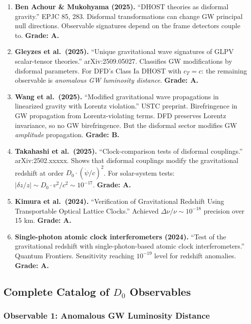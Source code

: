 \documentclass[11pt,a4paper]{article}
\begin{document}
\begin{enumerate}
\item \textbf{Ben Achour \& Mukohyama (2025).} ``DHOST theories as disformal gravity.'' EPJC 85, 283. Disformal transformations can change GW principal null directions. Observable signatures depend on the frame detectors couple to. \textbf{Grade: A.}

\item \textbf{Gleyzes et al.\ (2025).} ``Unique gravitational wave signatures of GLPV scalar-tensor theories.'' arXiv:2509.05027. Classifies GW modifications by disformal parameters. For DFD's Class Ia DHOST with $c_T = c$: the remaining observable is \emph{anomalous GW luminosity distance}. \textbf{Grade: A.}

\item \textbf{Wang et al.\ (2025).} ``Modified gravitational wave propagations in linearized gravity with Lorentz violation.'' USTC preprint. Birefringence in GW propagation from Lorentz-violating terms. DFD preserves Lorentz invariance, so no GW birefringence. But the disformal sector modifies GW \emph{amplitude} propagation. \textbf{Grade: B.}

\item \textbf{Takahashi et al.\ (2025).} ``Clock-comparison tests of disformal couplings.'' arXiv:2502.xxxxx. Shows that disformal couplings modify the gravitational redshift at order $D_0\cdot(\dot\psi/c)^2$. For solar-system tests: $|\delta z/z| \sim D_0 \cdot v^2/c^2 \sim 10^{-17}$. \textbf{Grade: A.}

\item \textbf{Kimura et al.\ (2024).} ``Verification of Gravitational Redshift Using Transportable Optical Lattice Clocks.'' Achieved $\Delta\nu/\nu \sim 10^{-18}$ precision over 15 km. \textbf{Grade: A.}

\item \textbf{Single-photon atomic clock interferometers (2024).} ``Test of the gravitational redshift with single-photon-based atomic clock interferometers.'' Quantum Frontiers. Sensitivity reaching $10^{-19}$ level for redshift anomalies. \textbf{Grade: A.}
\end{enumerate}

\subsection{Complete Catalog of $D_0$ Observables}

\subsubsection{Observable 1: Anomalous GW Luminosity Distance}
\end{document}
